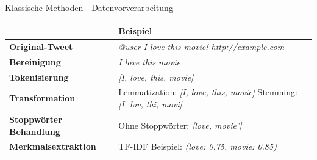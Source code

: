 \documentclass[aspectratio=169]{beamer}
\begin{document}
\begin{frame}{Klassische Methoden - Datenvorverarbeitung}
	\fontsize{10pt}{12pt}\selectfont
	\vspace{0.3cm}

	\begin{table}[]
		\centering
		\renewcommand{\arraystretch}{1.2}
		\begin{tabular}{l|p{7.5cm}}
			\hline
			                                & \textbf{Beispiel}                                                                                   \\
			\hline
			\textbf{Original-Tweet}         & \textit{\glqq @user I love this movie! http://example.com\grqq{}}                                   \\
			\hline
			\textbf{Bereinigung}            & \textit{\glqq I love this movie\grqq}                                                               \\
			\hline
			\textbf{Tokenisierung}          & \textit{[\glqq I\grqq, \glqq love\grqq, \glqq this\grqq, \glqq movie\grqq]}                         \\
			\hline
			\textbf{Transformation}         & Lemmatization: \textit{[\glqq I\grqq, \glqq love\grqq, \glqq this\grqq, \glqq movie\grqq]} \newline
			Stemming: \textit{[\glqq I\grqq, \glqq lov\grqq, \glqq thi\grqq, \glqq movi\grqq]}                                                    \\
			\hline
			\textbf{Stoppwörter Behandlung} & Ohne Stoppwörter: \textit{[\glqq love\grqq, \glqq movie\grq']}                                      \\
			\hline
			\textbf{Merkmalsextraktion}     & TF-IDF Beispiel: \newline
			\textit{(love: 0.75, movie: 0.85)}                                                                                                    \\
			\hline
		\end{tabular}
	\end{table}

\end{frame}
\end{document}
